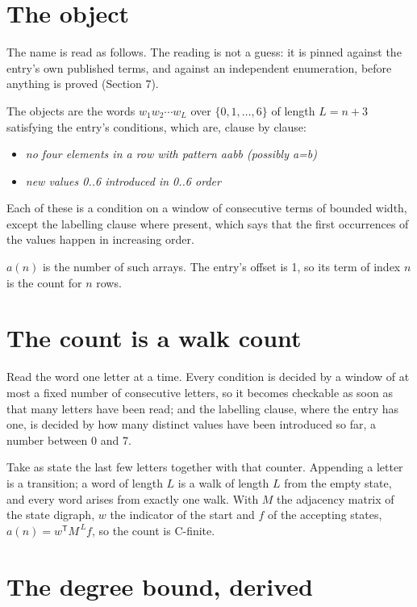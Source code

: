 \documentclass[11pt]{article}
\theoremstyle{definition}
\begin{document}
\section{The object}

The name is read as follows. The reading is not a guess: it is pinned against the entry's own published terms, and against an independent enumeration, before anything is proved (Section 7).

The objects are the words $w_1 w_2 \cdots w_L$ over $\{0,1,\dots,6\}$ of length $L = n + 3$ satisfying the entry's conditions, which are, clause by clause:

\begin{itemize}

\item {\itshape no four elements in a row with pattern aabb (possibly a=b)}

\item {\itshape new values 0..6 introduced in 0..6 order}

\end{itemize}

Each of these is a condition on a window of consecutive terms of bounded width, except the labelling clause where present, which says that the first occurrences of the values happen in increasing order.

$a(n)$ is the number of such arrays. The entry's offset is 1, so its term of index $n$ is the count for $n$ rows.

\section{The count is a walk count}

Read the word one letter at a time. Every condition is decided by a window of at most a fixed number of consecutive letters, so it becomes checkable as soon as that many letters have been read; and the labelling clause, where the entry has one, is decided by how many distinct values have been introduced so far, a number between $0$ and 7.

Take as state the last few letters together with that counter. Appending a letter is a transition; a word of length $L$ is a walk of length $L$ from the empty state, and every word arises from exactly one walk. With $M$ the adjacency matrix of the state digraph, $w$ the indicator of the start and $f$ of the accepting states, $a(n) = w^{\mathsf T}M^{\,L}f$, so the count is C-finite.

\section{The degree bound, derived}
\end{document}
